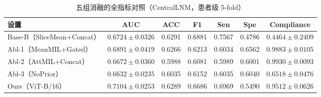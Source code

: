 \begin{table}[H]
\centering
\caption{五组消融的全指标对照（CentralLNM，患者级 5-fold）}
\label{tab:ablation_full_metrics}
\footnotesize
\setlength{\tabcolsep}{4pt}
\begin{tabular}{lcccccc}
\toprule
设置 & AUC & ACC & F1 & Sen & Spe & Compliance \\
\midrule
Base-B（SliceMean+Concat） & $0.6724\pm0.0326$ & 0.6291 & 0.6881 & 0.7567 & 0.4786 & $0.4464\pm0.2409$ \\
Abl-1（MeanMIL+Gated） & $0.6891\pm0.0419$ & 0.6266 & 0.6213 & 0.6034 & 0.6562 & $0.9883\pm0.0105$ \\
Abl-2（AttMIL+Concat） & $0.6672\pm0.0360$ & 0.5988 & 0.6081 & 0.5989 & 0.6001 & $0.9930\pm0.0093$ \\
Abl-3（NoPrior） & $0.6632\pm0.0235$ & 0.6035 & 0.6152 & 0.6035 & 0.6040 & $0.6518\pm0.0476$ \\
Ours（ViT-B/16） & $\mathbf{0.7104\pm0.0253}$ & 0.6289 & 0.6686 & 0.6969 & 0.5490 & $0.9512\pm0.0626$ \\
\bottomrule
\end{tabular}
\end{table}
